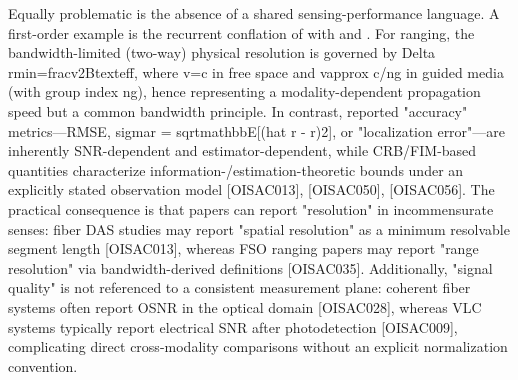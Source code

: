 {} Equally problematic is the absence of a shared sensing-performance language. A first-order example is the recurrent conflation of  with  and . For ranging, the bandwidth-limited (two-way) physical resolution is governed by\markdownRendererSoftLineBreak
{}\markdownRendererDollarSign{}\markdownRendererDollarSign{}\markdownRendererSoftLineBreak
{}\markdownRendererBackslash{}Delta r\markdownRendererUnderscore{}\markdownRendererLeftBrace{}\markdownRendererBackslash{}min\markdownRendererRightBrace{}=\markdownRendererBackslash{}frac\markdownRendererLeftBrace{}v\markdownRendererRightBrace{}\markdownRendererLeftBrace{}2B\markdownRendererUnderscore{}\markdownRendererLeftBrace{}\markdownRendererBackslash{}text\markdownRendererLeftBrace{}eff\markdownRendererRightBrace{}\markdownRendererRightBrace{}\markdownRendererRightBrace{},\markdownRendererSoftLineBreak
{}\markdownRendererDollarSign{}\markdownRendererDollarSign{}\markdownRendererSoftLineBreak
{}where \markdownRendererDollarSign{}v=c\markdownRendererDollarSign{} in free space and \markdownRendererDollarSign{}v\markdownRendererBackslash{}approx c/n\markdownRendererUnderscore{}g\markdownRendererDollarSign{} in guided media (with group index \markdownRendererDollarSign{}n\markdownRendererUnderscore{}g\markdownRendererDollarSign{}), hence representing a modality-dependent propagation speed but a common bandwidth principle. In contrast, reported "accuracy" metrics—RMSE, \markdownRendererDollarSign{}\markdownRendererBackslash{}sigma\markdownRendererUnderscore{}r = \markdownRendererBackslash{}sqrt\markdownRendererLeftBrace{}\markdownRendererBackslash{}mathbb\markdownRendererLeftBrace{}E\markdownRendererRightBrace{}[(\markdownRendererBackslash{}hat r - r)\markdownRendererCircumflex{}2]\markdownRendererRightBrace{}\markdownRendererDollarSign{}, or "localization error"—are inherently SNR-dependent and estimator-dependent, while CRB/FIM-based quantities characterize information-/estimation-theoretic bounds under an explicitly stated observation model [O\markdownRendererUnderscore{}ISAC\markdownRendererUnderscore{}013], [O\markdownRendererUnderscore{}ISAC\markdownRendererUnderscore{}050], [O\markdownRendererUnderscore{}ISAC\markdownRendererUnderscore{}056]. The practical consequence is that papers can report "resolution" in incommensurate senses: fiber DAS studies may report "spatial resolution" as a minimum resolvable segment length [O\markdownRendererUnderscore{}ISAC\markdownRendererUnderscore{}013], whereas FSO ranging papers may report "range resolution" via bandwidth-derived definitions [O\markdownRendererUnderscore{}ISAC\markdownRendererUnderscore{}035]. Additionally, "signal quality" is not referenced to a consistent measurement plane: coherent fiber systems often report OSNR in the optical domain [O\markdownRendererUnderscore{}ISAC\markdownRendererUnderscore{}028], whereas VLC systems typically report electrical SNR after photodetection [O\markdownRendererUnderscore{}ISAC\markdownRendererUnderscore{}009], complicating direct cross-modality comparisons without an explicit normalization convention.\markdownRendererParagraphSeparator
